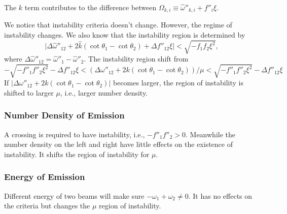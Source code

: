 The $k$ term contributes to the difference between $\Omega_{k,i}\equiv \hat\omega''_{k,i}+ f''_i\xi$.

We notice that instability criteria doesn't change. However, the regime of instability changes. We also know that the instability region is determined by
\begin{equation}
   \lvert \Delta\hat\omega''_{12} + 2\hat k (\cot \theta_1 - \cot\theta_2) + \Delta f''_{12}\xi \rvert < \sqrt{-f_1f_2\xi^2},
\end{equation}
where $\Delta \hat \omega''_{12} = \hat\omega''_1-\hat\omega''_2$. The instability region shift from
\begin{equation}
   -\sqrt{-f''_1f''_2\xi^2} -\Delta f''_{12}\xi < (\Delta\omega''_{12} + 2 k(\cot\theta_1-\cot\theta_2))/\mu < \sqrt{-f''_1f''_2\xi^2} -\Delta f''_{12}\xi
\end{equation}
If $\lvert \Delta\omega''_{12} + 2 k(\cot\theta_1-\cot\theta_2) \rvert$ becomes larger, the region of instability is shifted to larger $\mu$, i.e., larger number density.



\subsubsection{Number Density of Emission}


A crossing is required to have instability, i.e., $-f''_1f''_2>0$. Meanwhile the number density on the left and right have little effects on the existence of instability. It shifts the region of instability for $\mu$.


\subsubsection{Energy of Emission}



Different energy of two beams will make sure $-\omega_1 + \omega_2\neq 0$. It has no effects on the criteria but changes the $\mu$ region of instability.







